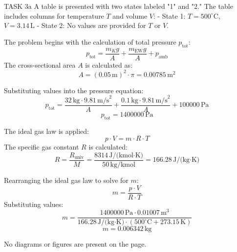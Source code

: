 TASK 3a  
A table is presented with two states labeled "1" and "2." The table includes columns for temperature \( T \) and volume \( V \):  
- State 1: \( T = 500^\circ\text{C} \), \( V = 3.14 \, \text{L} \)  
- State 2: No values are provided for \( T \) or \( V \).  

The problem begins with the calculation of total pressure \( p_{\text{tot}} \):  
\[
p_{\text{tot}} = \frac{m_K g}{A} + \frac{m_{\text{EW}} g}{A} + p_{\text{amb}}
\]  
The cross-sectional area \( A \) is calculated as:  
\[
A = (0.05 \, \text{m})^2 \cdot \pi = 0.00785 \, \text{m}^2
\]  

Substituting values into the pressure equation:  
\[
p_{\text{tot}} = \frac{32 \, \text{kg} \cdot 9.81 \, \text{m/s}^2}{A} + \frac{0.1 \, \text{kg} \cdot 9.81 \, \text{m/s}^2}{A} + 100000 \, \text{Pa}
\]  
\[
p_{\text{tot}} = 1400000 \, \text{Pa}
\]  

The ideal gas law is applied:  
\[
p \cdot V = m \cdot R \cdot T
\]  
The specific gas constant \( R \) is calculated:  
\[
R = \frac{R_{\text{univ}}}{M} = \frac{8314 \, \text{J/(kmol·K)}}{50 \, \text{kg/kmol}} = 166.28 \, \text{J/(kg·K)}
\]  

Rearranging the ideal gas law to solve for \( m \):  
\[
m = \frac{p \cdot V}{R \cdot T}
\]  
Substituting values:  
\[
m = \frac{1400000 \, \text{Pa} \cdot 0.01007 \, \text{m}^3}{166.28 \, \text{J/(kg·K)} \cdot (500^\circ\text{C} + 273.15 \, \text{K})}
\]  
\[
m = 0.006342 \, \text{kg}
\]  

No diagrams or figures are present on the page.